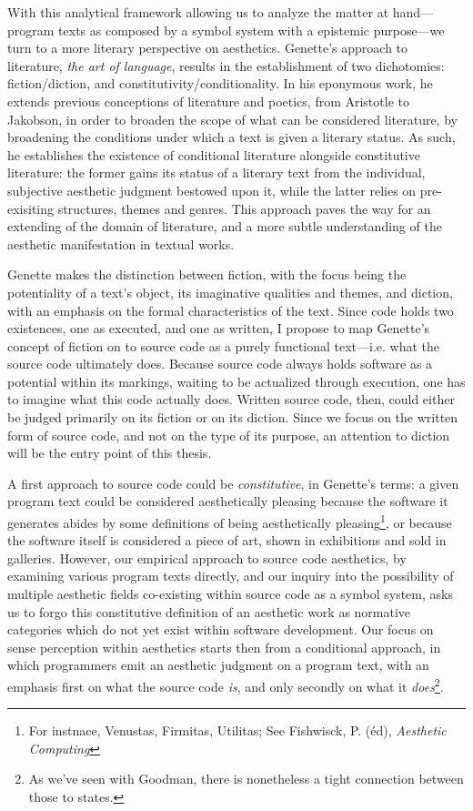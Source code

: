 With this analytical framework allowing us to analyze the matter at hand—program texts as composed by a symbol system with a epistemic purpose—we turn to a more literary perspective on aesthetics. Genette's approach to literature, \emph{the art of language}, results in the establishment of two dichotomies: fiction/diction, and constitutivity/conditionality. In his eponymous work\cite{genette_fiction_1993}, he extends previous conceptions of literature and poetics, from Aristotle to Jakobson, in order to broaden the scope of what can be considered literature, by broadening the conditions under which a text is given a literary status. As such, he establishes the existence of conditional literature alongside constitutive literature: the former gains its status of a literary text from the individual, subjective aesthetic judgment bestowed upon it, while the latter relies on pre-exisiting structures, themes and genres. This approach paves the way for an extending of the domain of literature\cite{gefen_extension_2019}, and a more subtle understanding of the aesthetic manifestation in textual works.

Genette makes the distinction between fiction, with the focus being the potentiality of a text's object, its imaginative qualities and themes, and diction, with an emphasis on the formal characteristics of the text. Since code holds two existences, one as executed, and one as written, I propose to map Genette's concept of fiction on to source code as a purely functional text—i.e. what the source code ultimately does. Because source code always holds software as a potential within its markings, waiting to be actualized through execution, one has to imagine what this code actually does. Written source code, then, could either be judged primarily on its fiction or on its diction. Since we focus on the written form of source code, and not on the type of its purpose, an attention to diction will be the entry point of this thesis.

A first approach to source code could be \emph{constitutive}, in Genette's terms: a given program text could be considered aesthetically pleasing because the software it generates abides by some definitions of being aesthetically pleasing\footnote{For instnace, Venustas, Firmitas, Utilitas; See Fishwisck, P. (éd), \emph{Aesthetic Computing}}, or because the software itself is considered a piece of art, shown in exhibitions and sold in galleries. However, our empirical approach to source code aesthetics, by examining various program texts directly, and our inquiry into the possibility of multiple aesthetic fields co-existing within source code as a symbol system, asks us to forgo this constitutive definition of an aesthetic work as normative categories which do not yet exist within software development. Our focus on sense perception within aesthetics starts then from a conditional approach, in which programmers emit an aesthetic judgment on a program text, with an emphasis first on what the source code \emph{is}, and only secondly on what it \emph{does}\footnote{As we've seen with Goodman, there is nonetheless a tight connection between those to states.}.

